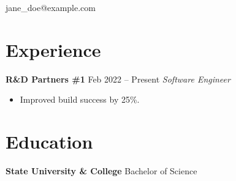 \documentclass{article}
\begin{document}
\def\name{Jane Doe}
jane\_doe@example.com

\section{Experience}
\textbf{R\&D Partners \#1} \hfill Feb 2022 -- Present
\textit{Software Engineer}
\begin{itemize}
\item Improved build success by 25\%.
\end{itemize}

\section{Education}
\textbf{State University \& College}
Bachelor of Science
\end{document}

